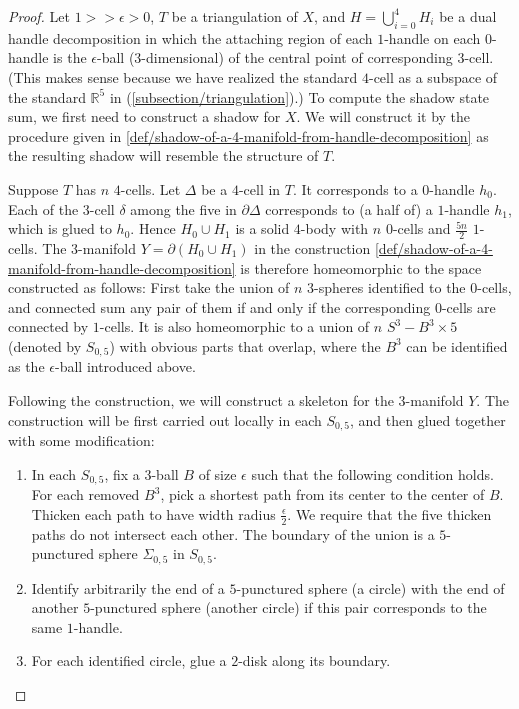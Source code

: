 \begin{proof}
  Let $1 >> \epsilon > 0$, $T$ be a triangulation of $X$, and
  $H = \bigcup_{i=0}^{4} H_{i}$ be a dual handle decomposition in
  which the attaching region of each $1$-handle on each
  $0$-handle is the $\epsilon$-ball ($3$-dimensional) of the
  central point of corresponding $3$-cell. (This makes sense
  because we have realized the standard $4$-cell as a subspace of
  the standard $\mathbb{R}^{5}$ in
  (\ref{subsection/triangulation}).) To compute the shadow state
  sum, we first need to construct a shadow for $X$. We will
  construct it by the procedure given in
  \ref{def/shadow-of-a-4-manifold-from-handle-decomposition} as
  the resulting shadow will resemble the structure of $T$.

  Suppose $T$ has $n$ $4$-cells. Let $\Delta$ be a $4$-cell in
  $T$. It corresponds to a $0$-handle $h_{0}$. Each of the
  $3$-cell $\delta$ among the five in $\partial \Delta$
  corresponds to (a half of) a $1$-handle $h_{1}$, which is glued
  to $h_{0}$. Hence $H_{0} \cup H_{1}$ is a solid $4$-body with
  $n$ $0$-cells and $\frac{5n}{2}$ $1$-cells. The $3$-manifold
  $Y = \partial(H_{0} \cup H_{1})$ in the
  construction \ref{def/shadow-of-a-4-manifold-from-handle-decomposition}
  is therefore homeomorphic to the space constructed as follows:
  First take the union of $n$ $3$-spheres identified to the
  $0$-cells, and connected sum any pair of them if and only if
  the corresponding $0$-cells are connected by $1$-cells. It is
  also homeomorphic to a union of $n$ $S^{3} - B^{3} \times 5$
  (denoted by $S_{0,5}$) with obvious parts that overlap, where
  the $B^{3}$ can be identified as the $\epsilon$-ball introduced
  above.

  Following the construction, we will construct a skeleton for
  the $3$-manifold $Y$. The construction will be first carried
  out locally in each $S_{0,5}$, and then glued together with
  some modification:

  \begin{enumerate}
    \item In each $S_{0,5}$, fix a $3$-ball $B$ of size
          $\epsilon$ such that the following condition holds. For
          each removed $B^{3}$, pick a shortest path from its
          center to the center of $B$. Thicken each path to have
          width radius $\frac{\epsilon}{2}$. We require that the
          five thicken paths do not intersect each other. The
          boundary of the union is a $5$-punctured sphere
          $\Sigma_{0,5}$ in $S_{0,5}$.
    \item Identify arbitrarily the end of a $5$-punctured sphere
          (a circle) with the end of another $5$-punctured sphere
          (another circle) if this pair corresponds to the same
          $1$-handle.
    \item For each identified circle, glue a $2$-disk along its
          boundary.
  \end{enumerate}


\end{proof}
